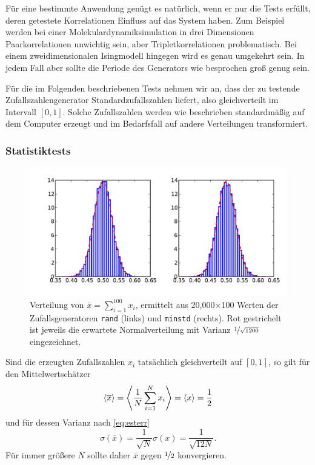 Für eine bestimmte Anwendung genügt es natürlich, wenn er nur die
Tests erfüllt, deren getestete Korrelationen Einfluss auf das System
haben. Zum Beispiel werden bei einer Molekulardynamiksimulation in
drei Dimensionen Paarkorrelationen unwichtig sein, aber
Tripletkorrelationen problematisch.  Bei einem zweidimensionalen
Isingmodell hingegen wird es genau umgekehrt sein.  In jedem Fall aber
sollte die Periode des Generators wie besprochen groß genug sein.

Für die im Folgenden beschriebenen Tests nehmen wir an, dass der zu
testende Zufallszahlengenerator Standardzufallszahlen liefert, also
gleichverteilt im Intervall $[0,1]$.  Solche Zufallszahlen werden wie
beschrieben standardmäßig auf dem Computer erzeugt und im Bedarfsfall
auf andere Verteilungen transformiert.

\subsubsection{Statistiktests}

\begin{figure}
  \centering
  \includegraphics[width=\textwidth]{plots/statistics_test}
  \caption{Verteilung von $\overline{x} = \sum_{i=1}^{100} x_i$,
    ermittelt aus 20,000$\times$100 Werten der Zufallsgeneratoren
    \texttt{rand} (links) und \texttt{minstd} (rechts). Rot
    gestrichelt ist jeweils die erwartete Normalverteilung mit Varianz
    $\nicefrac{1}{\sqrt{1200}}$ eingezeichnet.}
  \label{fig:statistics_test}
\end{figure}

Sind die erzeugten Zufallszahlen $x_i$ tatsächlich gleichverteilt auf
$[0,1]$, so gilt für den Mittelwertschätzer
\begin{equation}
  \left\langle{\overline{x}}\right\rangle =
  \left\langle{\frac{1}{N} \sum_{i=1}^N x_i}\right\rangle
  = \left\langle{x}\right\rangle = \frac{1}{2}
\end{equation}
und für dessen Varianz nach \eqref{eq:esterr}
\begin{equation}
  \sigma(\overline{x}) = \frac{1}{\sqrt{N}} \sigma(x) =
  \frac{1}{\sqrt{12 N}}.
\end{equation}
Für immer größere $N$ sollte daher $\overline{x}$ gegen
$\nicefrac{1}{2}$ konvergieren.

